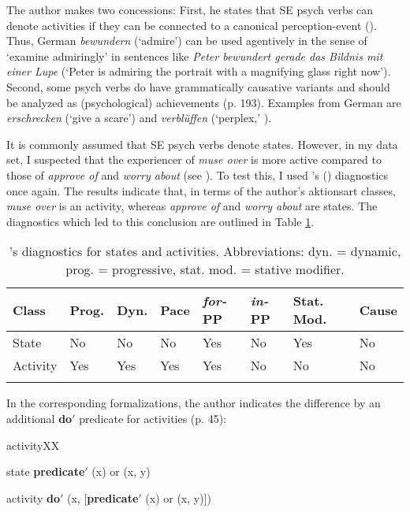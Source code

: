 The author makes two concessions: First, he states that SE psych verbs can denote activities if they can be connected to a canonical perception-event (\citealt[192--193]{Hartl.1999}). Thus, German \textit{bewundern} (`admire') can be used agentively in the sense of `examine admiringly' in sentences like \textit{Peter bewundert gerade das Bildnis mit einer Lupe} (`Peter is admiring the portrait with a magnifying glass right now'). Second, some psych verbs do have grammatically causative variants and should be analyzed as (psychological) achievements (p. 193). Examples from German are \textit{erschrecken} (`give a scare') and \textit{verbl\"uffen} (`perplex,' \citealt[191]{Hartl.2001book}).

It is commonly assumed that SE psych verbs denote states. However, in my data set, I suspected that the experiencer of \textit{muse over} is more active compared to those of \textit{approve of} and \textit{worry about} (see \citealt{Kawaletz.2015}). To test this, I used \citeauthor{VanValin.2005}'s (\citeyear{VanValin.2005}) diagnostics once again. 
The results indicate that, in terms of the author's aktionsart classes, \textit{muse over} is an activity, whereas \textit{approve of} and \textit{worry about} are states. The diagnostics which led to this conclusion are outlined in Table \ref{tab:psych-Valintests2}. 

\begin{table} 
		\caption[\citeauthor{VanValin.2005}'s diagnostics for states and activities]{\label{tab:psych-Valintests2} \citeauthor{VanValin.2005}'s diagnostics for states and activities. Abbreviations: dyn. = dynamic, prog. = progressive, stat. mod. = stative modifier.} 
		\begin{tabular} {llllllll}
 			\lsptoprule
			Class & Prog. & Dyn. & Pace & \textit{for-}PP & \textit{in-}PP & Stat. Mod. & Cause \\
			\midrule
			State & No & No & No & Yes & No & Yes & No \\
			Activity & Yes & Yes & Yes & Yes & No & No & No \\
			\lspbottomrule
		\end{tabular}
\end{table}   

In the corresponding formalizations, the author indicates the difference by an additional \textbf{do$'$} predicate for activities (p. 45):

\begin{labeling}{activityXX}
	\item [state] \textbf{predicate$'$} (x) or (x, y)
	\item [activity] \textbf{do$'$} (x, [\textbf{predicate$'$} (x) or (x, y)])
\end{labeling}


